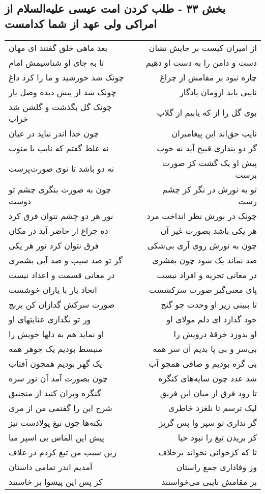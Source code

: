 \begin{center}
\section*{بخش ۳۳ - طلب کردن امت عیسی علیه‌السلام از امراکی ولی عهد از شما کدامست}
\label{sec:sh033}
\begin{longtable}{l p{0.5cm} r}
بعد ماهی خلق گفتند ای مهان
&&
از امیران کیست بر جایش نشان
\\
تا به جای او شناسیمش امام
&&
دست و دامن را به دست او دهیم
\\
چونک شد خورشید و ما را کرد داغ
&&
چاره نبود بر مقامش از چراغ
\\
چونک شد از پیش دیده وصل یار
&&
نایبی باید ازومان یادگار
\\
چونک گل بگذشت و گلشن شد خراب
&&
بوی گل را از که یابیم از گلاب
\\
چون خدا اندر نیاید در عیان
&&
نایب حق‌اند این پیغامبران
\\
نه غلط گفتم که نایب با منوب
&&
گر دو پنداری قبیح آید نه خوب
\\
نه دو باشد تا توی صورت‌پرست
&&
پیش او یک گشت کز صورت برست
\\
چون به صورت بنگری چشم تو دوست
&&
تو به نورش در نگر کز چشم رست
\\
نور هر دو چشم نتوان فرق کرد
&&
چونک در نورش نظر انداخت مرد
\\
ده چراغ ار حاضر آید در مکان
&&
هر یکی باشد بصورت غیر آن
\\
فرق نتوان کرد نور هر یکی
&&
چون به نورش روی آری بی‌شکی
\\
گر تو صد سیب و صد آبی بشمری
&&
صد نماند یک شود چون بفشری
\\
در معانی قسمت و اعداد نیست
&&
در معانی تجزیه و افراد نیست
\\
اتحاد یار با یاران خوشست
&&
پای معنی‌گیر صورت سرکشست
\\
صورت سرکش گدازان کن برنج
&&
تا ببینی زیر او وحدت چو گنج
\\
ور تو نگدازی عنایتهای او
&&
خود گدازد ای دلم مولای او
\\
او نماید هم به دلها خویش را
&&
او بدوزد خرقهٔ درویش را
\\
منبسط بودیم یک جوهر همه
&&
بی‌سر و بی پا بدیم آن سر همه
\\
یک گهر بودیم همچون آفتاب
&&
بی گره بودیم و صافی همچو آب
\\
چون بصورت آمد آن نور سره
&&
شد عدد چون سایه‌های کنگره
\\
گنگره ویران کنید از منجنیق
&&
تا رود فرق از میان این فریق
\\
شرح این را گفتمی من از مری
&&
لیک ترسم تا نلغزد خاطری
\\
نکته‌ها چون تیغ پولادست تیز
&&
گر نداری تو سپر وا پس گریز
\\
پیش این الماس بی اسپر میا
&&
کز بریدن تیغ را نبود حیا
\\
زین سبب من تیغ کردم در غلاف
&&
تا که کژخوانی نخواند برخلاف
\\
آمدیم اندر تمامی داستان
&&
وز وفاداری جمع راستان
\\
کز پس این پیشوا بر خاستند
&&
بر مقامش نایبی می‌خواستند
\\
\end{longtable}
\end{center}
